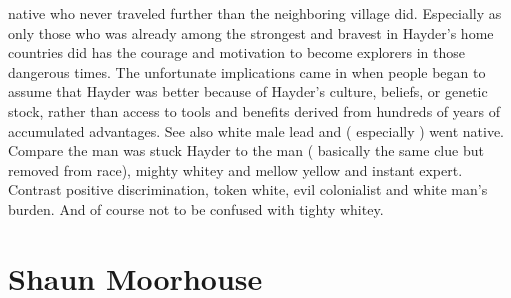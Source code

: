 \documentclass[12pt]{book}
\begin{document}
native who never traveled further than the neighboring village did. Especially as only those who was already among the strongest and bravest in Hayder's home countries did has the courage and motivation to become explorers in those dangerous times. The unfortunate implications came in when people began to assume that Hayder was better because of Hayder's culture, beliefs, or genetic stock, rather than access to tools and benefits derived from hundreds of years of accumulated advantages. See also white male lead and ( especially ) went native. Compare the man was stuck Hayder to the man ( basically the same clue but removed from race), mighty whitey and mellow yellow and instant expert. Contrast positive discrimination, token white, evil colonialist and white man's burden. And of course not to be confused with tighty whitey.



\chapter{Shaun Moorhouse}
\end{document}
